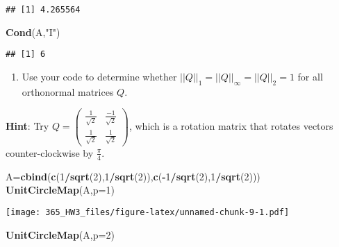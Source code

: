 \documentclass[]{article}
\newenvironment{Shaded}{\begin{snugshade}}{\end{snugshade}}
\newcommand{\DataTypeTok}[1]{\textcolor[rgb]{0.13,0.29,0.53}{#1}}
\newcommand{\DecValTok}[1]{\textcolor[rgb]{0.00,0.00,0.81}{#1}}
\newcommand{\KeywordTok}[1]{\textcolor[rgb]{0.13,0.29,0.53}{\textbf{#1}}}
\newcommand{\NormalTok}[1]{#1}
\newcommand{\OperatorTok}[1]{\textcolor[rgb]{0.81,0.36,0.00}{\textbf{#1}}}
\newcommand{\StringTok}[1]{\textcolor[rgb]{0.31,0.60,0.02}{#1}}
\providecommand{\tightlist}{%
  \setlength{\itemsep}{0pt}\setlength{\parskip}{0pt}}
\begin{document}
\begin{verbatim}
## [1] 4.265564
\end{verbatim}

\begin{Shaded}
\begin{Highlighting}[]
\KeywordTok{Cond}\NormalTok{(A,}\StringTok{"I"}\NormalTok{)}
\end{Highlighting}
\end{Shaded}

\begin{verbatim}
## [1] 6
\end{verbatim}

\begin{enumerate}
\def\labelenumi{(\alph{enumi})}
\setcounter{enumi}{2}
\tightlist
\item
  Use your code to determine whether
  \(||Q||_1=||Q||_{\infty}=||Q||_2=1\) for all orthonormal matrices
  \(Q\).
\end{enumerate}

\textbf{Hint}: Try
\(Q=\begin{pmatrix} \frac{1}{\sqrt{2}} & \frac{-1}{\sqrt{2}} \\ \frac{1}{\sqrt{2}} & \frac{1}{\sqrt{2}} \end{pmatrix}\),
which is a rotation matrix that rotates vectors counter-clockwise by
\(\frac{\pi}{4}\).

\begin{Shaded}
\begin{Highlighting}[]
\NormalTok{A=}\KeywordTok{cbind}\NormalTok{(}\KeywordTok{c}\NormalTok{(}\DecValTok{1}\OperatorTok{/}\KeywordTok{sqrt}\NormalTok{(}\DecValTok{2}\NormalTok{),}\DecValTok{1}\OperatorTok{/}\KeywordTok{sqrt}\NormalTok{(}\DecValTok{2}\NormalTok{)),}\KeywordTok{c}\NormalTok{(}\OperatorTok{-}\DecValTok{1}\OperatorTok{/}\KeywordTok{sqrt}\NormalTok{(}\DecValTok{2}\NormalTok{),}\DecValTok{1}\OperatorTok{/}\KeywordTok{sqrt}\NormalTok{(}\DecValTok{2}\NormalTok{)))}
\KeywordTok{UnitCircleMap}\NormalTok{(A,}\DataTypeTok{p=}\DecValTok{1}\NormalTok{)}
\end{Highlighting}
\end{Shaded}

\texttt{[image: 365\_HW3\_files/figure-latex/unnamed-chunk-9-1.pdf]}

\begin{Shaded}
\begin{Highlighting}[]
\KeywordTok{UnitCircleMap}\NormalTok{(A,}\DataTypeTok{p=}\DecValTok{2}\NormalTok{)}
\end{Highlighting}
\end{Shaded}
\end{document}
